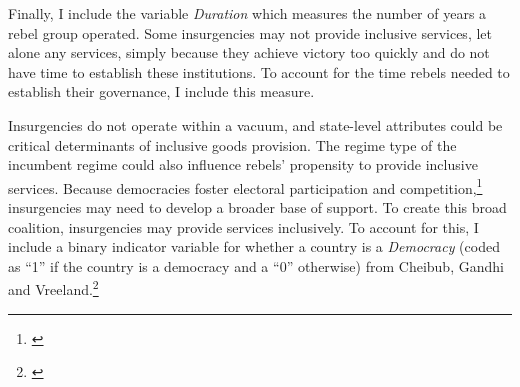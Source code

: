 \documentclass[12pt, letterpaper]{article}
\begin{document}





Finally, I include the variable \textit{Duration} which measures the number of years a rebel group operated. Some insurgencies may not provide inclusive services, let alone any services, simply because they achieve victory too quickly and do not have time to establish these institutions. To account for the  time rebels needed to establish their governance, I include this measure. 

Insurgencies do not operate within a vacuum, and state-level attributes could be critical determinants of inclusive goods provision. The regime type of the incumbent regime could also influence rebels' propensity to provide inclusive services. Because democracies foster electoral participation and competition,\footnote{\citealt{mulligan2004democracies}} insurgencies may need to develop a broader base of support. To create this broad coalition, insurgencies may provide services inclusively. To account for this, I include a binary indicator variable for whether a country is a \textit{Democracy} (coded as ``1''  if the country is a democracy and a ``0'' otherwise) from Cheibub, Gandhi and Vreeland.\footnote{\citealt{cheibub2010democracy}}
\end{document}
